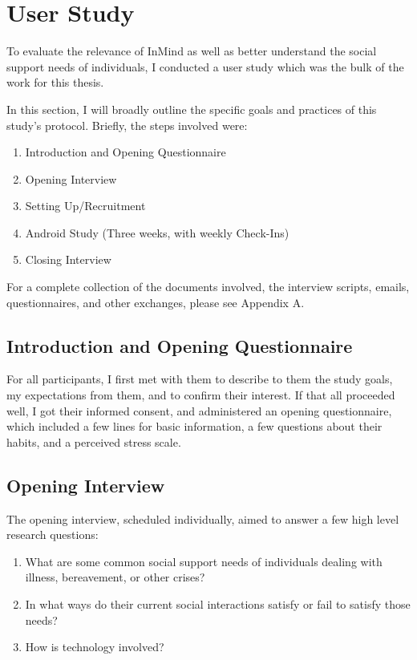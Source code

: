\chapter{User Study}
To evaluate the relevance of InMind as well as better understand
the social support needs of individuals,
I conducted a user study which was the bulk of the work for this thesis.

In this section, I will broadly outline the specific goals
and practices of this study's protocol.
Briefly, the steps involved were:
\begin{enumerate}
\item Introduction and Opening Questionnaire
\item Opening Interview
\item Setting Up/Recruitment
\item Android Study (Three weeks, with weekly Check-Ins)
\item Closing Interview
\end{enumerate}

  For a complete collection of the documents involved,
  the interview scripts, emails, questionnaires, and other exchanges,
  please see Appendix A.

\section{Introduction and Opening Questionnaire}
  For all participants,
  I first met with them to describe to them the study goals,
  my expectations from them, and to confirm their interest.
  If that all proceeded well, I got their informed consent,
  and administered an opening questionnaire,
  which included a few lines for basic information,
  a few questions about their habits,
  and a perceived stress scale.
  
\section{Opening Interview}
  \label{sec:opening_int}
  The opening interview, scheduled individually,
  aimed to answer a few high level research questions:
  \begin{enumerate}
  \item What are some common social support needs of individuals
  dealing with illness, bereavement, or other crises?
  \item In what ways do their current social interactions satisfy
  or fail to satisfy those needs?
  \item How is technology involved?
  \end{enumerate}

